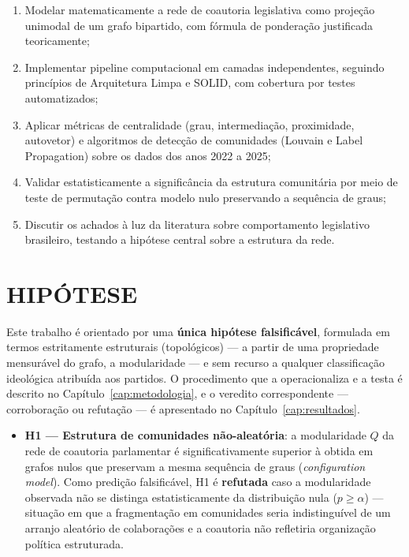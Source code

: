 \documentclass[
      12pt,
      a4paper,
      openright,
      oneside,
      chapter=TITLE,
      section=TITLE,
      english,
      french,
      spanish,
      brazilian
    ]{abntex2}
\begin{document}
    \begin{enumerate}[label=\alph*)]
        \item Modelar matematicamente a rede de coautoria legislativa como projeção unimodal de um grafo bipartido, com fórmula de ponderação justificada teoricamente;
        \item Implementar pipeline computacional em camadas independentes, seguindo princípios de Arquitetura Limpa e SOLID, com cobertura por testes automatizados;
        \item Aplicar métricas de centralidade (grau, intermediação, proximidade, autovetor) e algoritmos de detecção de comunidades (Louvain e Label Propagation) sobre os dados dos anos 2022 a 2025;
        \item Validar estatisticamente a significância da estrutura comunitária por meio de teste de permutação contra modelo nulo preservando a sequência de graus;
        \item Discutir os achados à luz da literatura sobre comportamento legislativo brasileiro, testando a hipótese central sobre a estrutura da rede.
    \end{enumerate}
    
    \section{HIPÓTESE}
    
    Este trabalho é orientado por uma \textbf{única hipótese falsificável}, formulada em termos estritamente estruturais (topológicos) --- a partir de uma propriedade mensurável do grafo, a modularidade --- e sem recurso a qualquer classificação ideológica atribuída aos partidos. O procedimento que a operacionaliza e a testa é descrito no Capítulo~\ref{cap:metodologia}, e o veredito correspondente --- corroboração ou refutação --- é apresentado no Capítulo~\ref{cap:resultados}.
    
    \begin{itemize}
        \item \textbf{H1 --- Estrutura de comunidades não-aleatória}: a modularidade $Q$ da rede de coautoria parlamentar é significativamente superior à obtida em grafos nulos que preservam a mesma sequência de graus (\textit{configuration model}). Como predição falsificável, H1 é \textbf{refutada} caso a modularidade observada não se distinga estatisticamente da distribuição nula ($p \geq \alpha$) --- situação em que a fragmentação em comunidades seria indistinguível de um arranjo aleatório de colaborações e a coautoria não refletiria organização política estruturada.
    \end{itemize}
    
\end{document}
